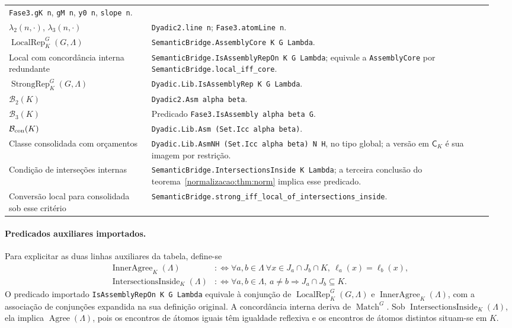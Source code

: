 \documentclass[12pt,a4paper]{article}
\theoremstyle{preciso}
\theoremstyle{definition}
\newcommand{\CK}{\mathsf C_K}
\newcommand{\Match}{\operatorname{Match}}
\newcommand{\Agree}{\operatorname{Agree}}
\newcommand{\Loc}{\operatorname{LocalRep}}
\newcommand{\Str}{\operatorname{StrongRep}}
\newcommand{\code}[1]{\nolinkurl{#1}}
\theoremstyle{preciso}
\theoremstyle{preciso}
\theoremstyle{preciso}
\theoremstyle{preciso}
\theoremstyle{definition}
\theoremstyle{preciso}
\theoremstyle{definition}
\theoremstyle{preciso}
\theoremstyle{preciso}
\theoremstyle{definition}
\begin{document}
\begin{longtable}{@{}>{\raggedright\arraybackslash}p{0.28\linewidth}>{\raggedright\arraybackslash}p{0.67\linewidth}@{}}
\code{Fase3.gK n}, \code{gM n}, \code{y0 n}, \code{slope n}.\\
$\lambda_2(n,\cdot)$, $\lambda_3(n,\cdot)$ &
\code{Dyadic2.line n}; \code{Fase3.atomLine n}.\\
$\Loc^G_K(G,\Lambda)$ &
\code{SemanticBridge.AssemblyCore K G Lambda}.\\
Local com concordância interna redundante &
\code{SemanticBridge.IsAssemblyRepOn K G Lambda}; equivale a
\code{AssemblyCore} por \code{SemanticBridge.local_iff_core}.\\
$\Str^G_K(G,\Lambda)$ &
\code{Dyadic.Lib.IsAssemblyRep K G Lambda}.\\
$\mathcal B_2(K)$ & \code{Dyadic2.Asm alpha beta}.\\
$\mathcal B_3(K)$ & Predicado \code{Fase3.IsAssembly alpha beta G}.\\
$\mathcal B_{\rm con}(K)$ & \code{Dyadic.Lib.Asm (Set.Icc alpha beta)}.\\
Classe consolidada com orçamentos &
\code{Dyadic.Lib.AsmNH (Set.Icc alpha beta) N H}, no tipo global;
a versão em $\CK$ é sua imagem por restrição.\\
Condição de interseções internas &
\code{SemanticBridge.IntersectionsInside K Lambda}; a terceira conclusão
do teorema~\ref{normalizacao:thm:norm} implica esse predicado.\\
Conversão local para consolidada sob esse critério &
\code{SemanticBridge.strong_iff_local_of_intersections_inside}.\\
\bottomrule
\end{longtable}

\paragraph{Predicados auxiliares importados.}
Para explicitar as duas linhas auxiliares da tabela, define-se
\begin{align*}
 \operatorname{InnerAgree}_K(\Lambda)
 &:\Longleftrightarrow
 \forall a,b\in\Lambda\ \forall x\in J_a\cap J_b\cap K,\
                    \ell_a(x)=\ell_b(x),\\
 \operatorname{IntersectionsInside}_K(\Lambda)
 &:\Longleftrightarrow
 \forall a,b\in\Lambda,\ a\ne b\Rightarrow J_a\cap J_b\subseteq K.
\end{align*}
O predicado importado \code{IsAssemblyRepOn K G Lambda} equivale à conjunção
de $\Loc^G_K(G,\Lambda)$ e $\operatorname{InnerAgree}_K(\Lambda)$,
com a associação de conjunções expandida na sua definição original.
A concordância interna deriva de $\Match^G$. Sob
$\operatorname{IntersectionsInside}_K(\Lambda)$, ela implica
$\Agree(\Lambda)$, pois os encontros de átomos iguais têm igualdade
reflexiva e os encontros de átomos distintos situam-se em $K$.
\end{document}

